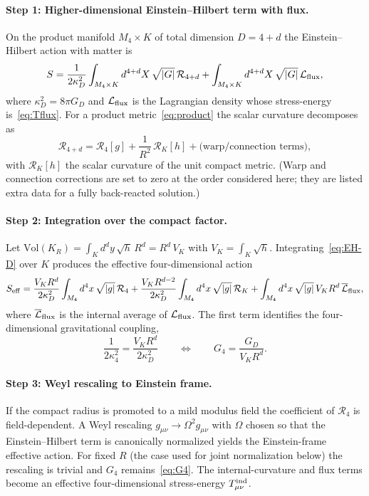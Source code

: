 \documentclass[11pt,a4paper]{article}
\begin{document}
\paragraph{Step 1: Higher-dimensional Einstein--Hilbert term with flux.}
On the product manifold \(M_4\times K\) of total dimension \(D=4+d\) the Einstein--Hilbert action with matter is
\begin{equation}
S=\frac{1}{2\kappa_D^2}\int_{M_4\times K}d^{4+d}X\,\sqrt{|G|}\,\mathcal{R}_{4+d}
+\int_{M_4\times K}d^{4+d}X\,\sqrt{|G|}\,\mathcal{L}_{\rm flux},
\label{eq:EH-D}
\end{equation}
where \(\kappa_D^2=8\pi G_D\) and \(\mathcal{L}_{\rm flux}\) is the Lagrangian density whose stress-energy is~\eqref{eq:Tflux}. For a product metric~\eqref{eq:product} the scalar curvature decomposes as
\begin{equation}
\mathcal{R}_{4+d}=\mathcal{R}_4[g]+\frac{1}{R^2}\,\mathcal{R}_K[h]+\text{(warp/connection terms)},
\label{eq:R-split}
\end{equation}
with \(\mathcal{R}_K[h]\) the scalar curvature of the unit compact metric. (Warp and connection corrections are set to zero at the order considered here; they are listed extra data for a fully back-reacted solution.)

\paragraph{Step 2: Integration over the compact factor.}
Let \(\mathrm{Vol}(K_R)=\int_K d^dy\,\sqrt{h}\,R^d=R^d\,V_K\) with \(V_K=\int_K\sqrt{h}\). Integrating~\eqref{eq:EH-D} over \(K\) produces the effective four-dimensional action
\begin{equation}
S_{\rm eff}=\frac{V_K R^d}{2\kappa_D^2}\int_{M_4}d^4x\,\sqrt{|g|}\,\mathcal{R}_4
+\frac{V_K R^{d-2}}{2\kappa_D^2}\int_{M_4}d^4x\,\sqrt{|g|}\,\mathcal{R}_K
+\int_{M_4}d^4x\,\sqrt{|g|}\,V_K R^d\,\overline{\mathcal{L}}_{\rm flux},
\label{eq:Seff}
\end{equation}
where \(\overline{\mathcal{L}}_{\rm flux}\) is the internal average of \(\mathcal{L}_{\rm flux}\). The first term identifies the four-dimensional gravitational coupling,
\begin{equation}
\frac{1}{2\kappa_4^2}=\frac{V_K R^d}{2\kappa_D^2}
\qquad\Longleftrightarrow\qquad
G_4=\frac{G_D}{V_K R^d}.
\label{eq:G4}
\end{equation}

\paragraph{Step 3: Weyl rescaling to Einstein frame.}
If the compact radius is promoted to a mild modulus field the coefficient of \(\mathcal{R}_4\) is field-dependent. A Weyl rescaling \(g_{\mu\nu}\to\Omega^2 g_{\mu\nu}\) with \(\Omega\) chosen so that the Einstein--Hilbert term is canonically normalized yields the Einstein-frame effective action. For fixed \(R\) (the case used for joint normalization below) the rescaling is trivial and \(G_4\) remains~\eqref{eq:G4}. The internal-curvature and flux terms become an effective four-dimensional stress-energy \(T_{\mu\nu}^{\rm ind}\).
\end{document}

